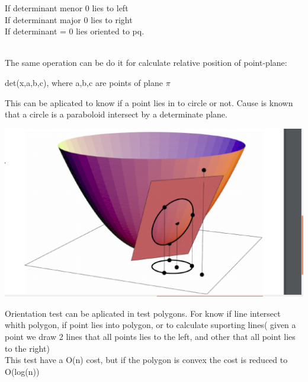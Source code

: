 \documentclass{article}
\begin{document}
        If determinant menor 0 lies to left
        \\

        If determinant major 0 lies to right
        \\

        If determinant = 0 lies oriented to pq.

        \\

        The same operation can be do it for calculate relative position of point-plane:

        \begin{center}
        det(x,a,b,c), where a,b,c are points of plane $\pi$
        \end{center}

      \newpage
      This can be aplicated to know if a point lies in to circle or not. Cause is known that a circle is a paraboloid intersect by a determinate plane.

      \includegraphics[width=\textwidth]{Paraboloid}



      Orientation test can be aplicated in test polygons. For know if line intersect whith polygon, if point lies into polygon, or to calculate suporting lines( given a point we draw 2 lines that all points lies to the left, and other that all point lies to the right)
      \\ This test have a O(n) cost, but if the polygon is convex the cost is reduced to O(log(n))
\end{document}
